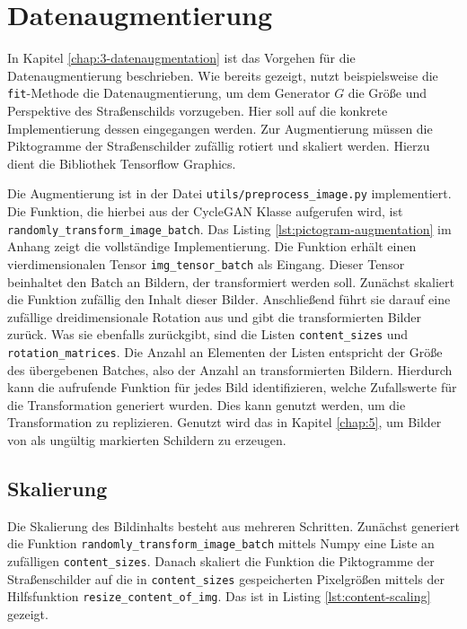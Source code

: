 \section{Datenaugmentierung}
In Kapitel \ref{chap:3-datenaugmentation} ist das Vorgehen für die Datenaugmentierung beschrieben. Wie bereits gezeigt, nutzt beispielsweise die \texttt{fit}-Methode die Datenaugmentierung, um dem Generator $G$ die Größe und Perspektive des Straßenschilds vorzugeben. Hier soll auf die konkrete Implementierung dessen eingegangen werden. Zur Augmentierung müssen die Piktogramme der Straßenschilder zufällig rotiert und skaliert werden. Hierzu dient die Bibliothek Tensorflow Graphics.

Die Augmentierung ist in der Datei \texttt{utils/preprocess_image.py} implementiert. Die Funktion, die hierbei aus der CycleGAN Klasse aufgerufen wird, ist \texttt{randomly_transform_image_batch}. Das Listing \ref{lst:pictogram-augmentation} im Anhang zeigt die vollständige Implementierung. Die Funktion erhält einen vierdimensionalen Tensor \texttt{img_tensor_batch} als Eingang. Dieser Tensor beinhaltet den Batch an Bildern, der transformiert werden soll. Zunächst skaliert die Funktion zufällig den Inhalt dieser Bilder. Anschließend führt sie darauf eine zufällige dreidimensionale Rotation aus und gibt die transformierten Bilder zurück. Was sie ebenfalls zurückgibt, sind die Listen \texttt{content_sizes} und \texttt{rotation_matrices}. Die Anzahl an Elementen der Listen entspricht der Größe des übergebenen Batches, also der Anzahl an transformierten Bildern. Hierdurch kann die aufrufende Funktion für jedes Bild identifizieren, welche Zufallswerte für die Transformation generiert wurden. Dies kann genutzt werden, um die Transformation zu replizieren. Genutzt wird das in Kapitel \ref{chap:5}, um Bilder von als ungültig markierten Schildern zu erzeugen.

\subsection{Skalierung}
Die Skalierung des Bildinhalts besteht aus mehreren Schritten. Zunächst generiert die Funktion \texttt{randomly_transform_image_batch} mittels Numpy eine Liste an zufälligen \texttt{content_sizes}. Danach skaliert die Funktion die Piktogramme der Straßenschilder auf die in \texttt{content_sizes} gespeicherten Pixelgrößen mittels der Hilfsfunktion \texttt{resize_content_of_img}. Das ist in Listing \ref{lst:content-scaling} gezeigt.

